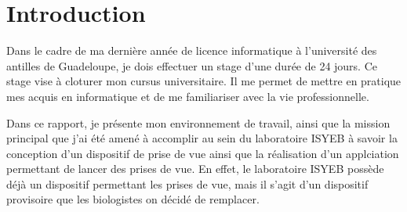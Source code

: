 \chapter{Introduction}
    Dans le cadre de ma dernière année de licence informatique à l'université des antilles de Guadeloupe, je dois effectuer un stage d'une durée de 24 jours. Ce stage vise à cloturer mon cursus universitaire.
    Il me permet de mettre en pratique mes acquis en informatique et de me familiariser avec la vie professionnelle.

    \vspace{0.5cm}
    Dans ce rapport, je présente mon environnement de travail, ainsi que la mission principal que j'ai été amené à accomplir au sein du laboratoire ISYEB à savoir la conception d'un dispositif de prise de vue ainsi que la réalisation d'un applciation permettant de lancer des prises de vue.
    En effet, le laboratoire ISYEB possède déjà un dispositif permettant les prises de vue, mais il s'agit d'un dispositif provisoire que les biologistes on décidé de remplacer.
    
